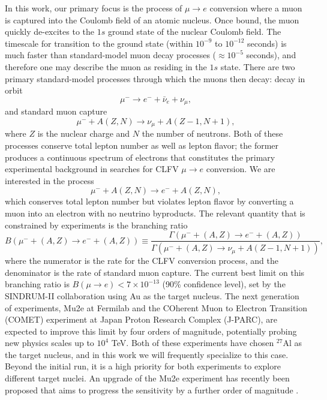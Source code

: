 \documentclass{book}[letterpaper,12pt]
\begin{document}
In this work, our primary focus is the process of $\mu\rightarrow e$ conversion where a muon is captured into the Coulomb field of an atomic nucleus. 
Once bound, the muon quickly de-excites to the $1s$ ground state of the nuclear Coulomb field. The timescale for transition to the ground state (within $10^{-9}$ to $10^{-12}$ seconds) is much faster than standard-model muon decay processes ($\approx 10^{-5}$ seconds), and therefore one may describe the muon as residing in the $1s$ state. There are two primary standard-model processes through which the muons then decay: decay in orbit
\begin{equation}
\mu^-\rightarrow e^- + \bar{\nu}_e+\nu_{\mu},
\end{equation}
and standard muon capture
\begin{equation}
\mu^- + A(Z,N)\rightarrow \nu_{\mu}+A(Z-1,N+1),
\end{equation}
where $Z$ is the nuclear charge and $N$ the number of neutrons. Both of these processes conserve total lepton number as well as lepton flavor; the former produces a continuous spectrum of electrons that constitutes the primary experimental background in searches for CLFV $\mu\rightarrow e$ conversion. We are interested in the process
\begin{equation}
\mu^-+A(Z,N)\rightarrow e^- + A(Z,N),
\end{equation}
which conserves total lepton number but violates lepton flavor  by converting a muon into an electron with no neutrino byproducts. The relevant quantity that is constrained by experiments is the branching ratio
\begin{equation}
B(\mu^-+(A,Z)\rightarrow e^- + (A,Z))\equiv\frac{\Gamma(\mu^-+(A,Z)\rightarrow e^-+(A,Z))}{\Gamma(\mu^-+(A,Z)\rightarrow\nu_{\mu}+A(Z-1,N+1))},
\end{equation}
where the numerator is the rate for the CLFV conversion process, and the denominator is the rate of standard muon capture. The current best limit on this branching ratio is $B(\mu\rightarrow e)<7\times 10^{-13}$ (90\% confidence level), set by the SINDRUM-II collaboration \cite{Bertl2006} using Au as the target nucleus. The next generation of experiments, Mu2e at Fermilab \cite{Bernstein_2019} and the COherent Muon to Electron Transition (COMET) experiment \cite{10.3389/fphy.2018.00133} at Japan Proton Research Complex (J-PARC), are expected to improve this limit by four orders of magnitude, potentially probing new physics scales up to $10^4$ TeV. Both of these experiments have chosen $^{27}$Al as the target nucleus, and in this work we will frequently specialize to this case. Beyond the initial run, it is a high priority for both experiments to explore different target nuclei. An upgrade of the Mu2e experiment has recently been proposed that aims to progress the sensitivity by a further order of magnitude \cite{Mu2e:2018osu}.
\end{document}

